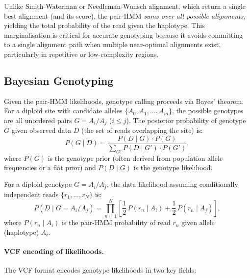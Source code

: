 \begin{keyconcept}[title={Why Pair-HMM Instead of Standard Alignment?}]
Unlike Smith-Waterman or Needleman-Wunsch alignment, which return a single best alignment (and its score), the pair-HMM \emph{sums over all possible alignments}, yielding the total probability of the read given the haplotype. This marginalisation is critical for accurate genotyping because it avoids committing to a single alignment path when multiple near-optimal alignments exist, particularly in repetitive or low-complexity regions.
\end{keyconcept}

\subsection{Bayesian Genotyping}
\label{subsec:variants:bayesian_gt}

Given the pair-HMM likelihoods, genotype calling proceeds via Bayes' theorem. For a diploid site with candidate alleles $\{A_0, A_1, \ldots, A_m\}$, the possible genotypes are all unordered pairs $G = A_i / A_j$ ($i \leq j$). The posterior probability of genotype $G$ given observed data $D$ (the set of reads overlapping the site) is:
\begin{equation}
\label{eq:variants:genotype_posterior}
P(G \mid D) = \frac{P(D \mid G) \cdot P(G)}{\sum_{G'} P(D \mid G') \cdot P(G')},
\end{equation}
where $P(G)$ is the genotype prior (often derived from population allele frequencies or a flat prior) and $P(D \mid G)$ is the genotype likelihood.

For a diploid genotype $G = A_i / A_j$, the data likelihood assuming conditionally independent reads $\{r_1, \ldots, r_N\}$ is:
\begin{equation}
\label{eq:variants:genotype_likelihood}
P(D \mid G = A_i/A_j) = \prod_{n=1}^{N} \left[ \frac{1}{2}\, P(r_n \mid A_i) + \frac{1}{2}\, P(r_n \mid A_j) \right],
\end{equation}
where $P(r_n \mid A_i)$ is the pair-HMM probability of read $r_n$ given allele (haplotype) $A_i$.

\paragraph{VCF encoding of likelihoods.}
The VCF format encodes genotype likelihoods in two key fields:

